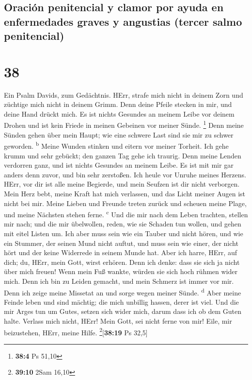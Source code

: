 \hypertarget{oraciuxf3n-penitencial-y-clamor-por-ayuda-en-enfermedades-graves-y-angustias-tercer-salmo-penitencial}{%
\subsection{Oración penitencial y clamor por ayuda en enfermedades
graves y angustias (tercer salmo
penitencial)}\label{oraciuxf3n-penitencial-y-clamor-por-ayuda-en-enfermedades-graves-y-angustias-tercer-salmo-penitencial}}

\hypertarget{section-37}{%
\section{38}\label{section-37}}

 Ein Psalm Davids, zum Gedächtnis.  HErr,
strafe mich nicht in deinem Zorn und züchtige mich nicht in deinem
Grimm.  Denn deine Pfeile stecken in mir, und deine Hand
drückt mich.  Es ist nichts Gesundes an meinem Leibe vor
deinem Drohen und ist kein Friede in meinen Gebeinen vor meiner Sünde.
\footnote{\textbf{38:4} Ps 51,10}  Denn meine Sünden gehen
über mein Haupt; wie eine schwere Last sind sie mir zu schwer geworden.
\textsuperscript{b}  Meine Wunden stinken und eitern vor
meiner Torheit.  Ich gehe krumm und sehr gebückt; den
ganzen Tag gehe ich traurig.  Denn meine Lenden verdorren
ganz, und ist nichts Gesundes an meinem Leibe.  Es ist mit
mir gar anders denn zuvor, und bin sehr zerstoßen. Ich heule vor Unruhe
meines Herzens.  HErr, vor dir ist alle meine Begierde,
und mein Seufzen ist dir nicht verborgen.  Mein Herz
bebt, meine Kraft hat mich verlassen, und das Licht meiner Augen ist
nicht bei mir.  Meine Lieben und Freunde treten zurück
und scheuen meine Plage, und meine Nächsten stehen ferne.
\textsuperscript{c}  Und die mir nach dem Leben trachten,
stellen mir nach; und die mir übelwollen, reden, wie sie Schaden tun
wollen, und gehen mit eitel Listen um.  Ich aber muss
sein wie ein Tauber und nicht hören, und wie ein Stummer, der seinen
Mund nicht auftut,  und muss sein wie einer, der nicht
hört und der keine Widerrede in seinem Munde hat.  Aber
ich harre, HErr, auf dich; du, HErr, mein Gott, wirst erhören.
 Denn ich denke: dass sie sich ja nicht über mich freuen!
Wenn mein Fuß wankte, würden sie sich hoch rühmen wider mich.
 Denn ich bin zu Leiden gemacht, und mein Schmerz ist
immer vor mir.  Denn ich zeige meine Missetat an und
sorge wegen meiner Sünde. \textsuperscript{d}  Aber meine
Feinde leben und sind mächtig; die mich unbillig hassen, derer ist viel.
 Und die mir Arges tun um Gutes, setzen sich wider mich,
darum dass ich ob dem Guten halte.  Verlass mich nicht,
HErr! Mein Gott, sei nicht ferne von mir!  Eile, mir
beizustehen, HErr, meine Hilfe. \footnote{\textbf{39:10} 2Sam 16,10}{[}\textbf{38:19}
Ps 32,5{]}

